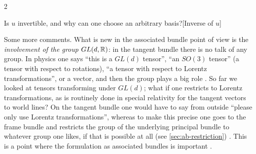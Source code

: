 \begin{paracol}{2}
\begin{answer}{Is $u$ invertible, and why can one choose an arbitrary basis?}[Inverse of $u$]
\end{answer}
Some more comments. What is new in the associated bundle point of view is the \emph{involvement of the group} $GL(d,\mathbb{R})$: in the tangent bundle there is no talk of any group. In physics one says ``this is a $GL(d)$ tensor'', ``an $SO(3)$ tensor'' (a tensor with respect to rotations), ``a tensor with respect to Lorentz transformations'', or a vector, and then the group plays a big role   . So far we looked at tensors transforming under $GL(d)$; what if one restricts to Lorentz transformations, as is routinely done in special relativity for the tangent vectors to world lines? On the tangent bundle one would have to say from outside ``please only use Lorentz transformations'', whereas to make this precise one goes to the frame bundle and restricts the group of the underlying principal bundle to whatever group one likes, if that is possible at all (see \cref{sec:ab-restriction})    . This is a point where the formulation as associated bundles is important  .


\end{paracol}
